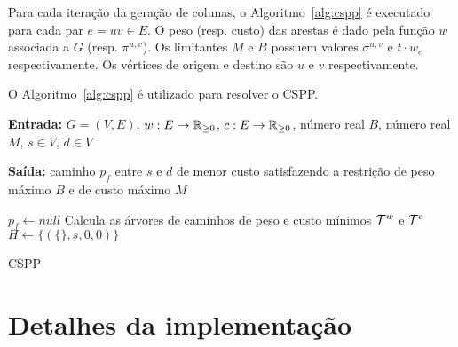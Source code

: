 Para cada iteração da geração de colunas, o Algoritmo~\ref{alg:cspp}
é executado para cada par $e=uv \in E$.
O peso (resp. custo) das arestas é dado
pela função $w$ associada a $G$ (resp. $\pi^{u,v}$).
Os limitantes
$M$ e $B$ possuem valores $\sigma^{u,v}$ e $t \cdot w_e$ respectivamente.
Os vértices de origem e destino são $u$ e $v$ respectivamente. 


O Algoritmo~\ref{alg:cspp} é utilizado para resolver o CSPP.


\begin{algorithm}
  \SetAlgoLined
  
  \textbf{Entrada:} {$G=(V, E)$, $w: E \to \mathbb{R}_{\ge 0}$, $c: E \to \mathbb{R}_{\ge 0}$, número real $B$, número real $M$, $s \in V$, $d \in V$}\;
  
  \textbf{Saída:} {caminho $p_f$ entre $s$ e $d$ de menor custo satisfazendo a restrição de peso máximo $B$ e de custo máximo $M$}\;
  
  $p_f \gets null$\;
  Calcula as árvores de caminhos de peso e custo mínimos $\mathcal{T}^{w}$ e $\mathcal{T}^{c}$\;
  $H \gets \{(\{\},s,0,0)\}$\;
  \caption{CSPP} 
  \label{alg:cspp}
\end{algorithm}


\section{Detalhes da implementação}
\label{sec:implementacao}

